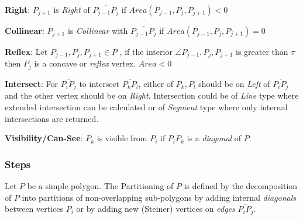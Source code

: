\begin{list}{}{}
\item {\bf Right}: $P_{j+1}$ is {\em Right} of $ \overline{P_{j-1} P_j}$ if $Area( P_{j-1}, P_j,  P_{j+1}) < 0$ 

\item {\bf Collinear}: $P_{j+1}$ is {\em Collinear} with $ \overline{P_{j-1} P_j}$ if $Area( P_{j-1}, P_j,  P_{j+1}) = 0$ 

\item {\bf Reflex}: Let  $ P_{j-1}, P_j,  P_{j+1} \in P $ , if the interior $\angle P_{j-1}, P_j,  P_{j+1}$ is greater than $\pi$  then $P_j$  is a concave or {\em reflex} vertex. $Area < 0$

\item {\bf Intersect}: For  $\overline{P_i P_j}$ to intersect $\overline{P_k P_l}$, either of $P_k, P_l$ should be on {\em Left} of  $\overline{P_i P_j}$ and the other vertex should be on {\em Right}. Intersection could be of {\em Line} type where extended intersection can be calculated or of {\em Segment} type where only internal intersections are returned.

\item {\bf Visibility/Can-See}: $P_k$ is visible from $P_i$ if $\overline{P_i P_k}$ is a {\em diagonal} of $P$. 

\end{list}

\subsubsection{Steps}
Let $P$ be a simple polygon.  The Partitioning of $P$ is defined by the decomposition of $P$ into partitions of non-overlapping sub-polygons by adding internal {\em diagonals} between vertices  $P_i$ or by adding new (Steiner) vertices on {\em edges} $\overline{P_i P_j}$.

